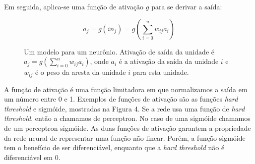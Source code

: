 \documentclass[a4paper,10pt]{article}
\theoremstyle{plain}
\begin{document}
Em seguida, aplica-se uma função de ativação $g$ para se derivar a saída:

\begin{equation*}
  a_j = g(in_j) = g \left(\sum_{i=0}^n w_{ij} a_i\right)
\end{equation*}

\begin{figure}[h]
  \caption{Um modelo para um neurônio. Ativação de saída da unidade é $a_j = g(\sum_{i=0}^n w_{ij}
    a_i)$, onde $a_i$ é a ativação da saída da unidade $i$ e $w_{ij}$ é o peso da aresta da unidade
    $i$ para esta unidade.}
\end{figure}

A função de ativação é uma função limitadora em que normalizamos a saída em um número entre 0 e 1.
Exemplos de funções de ativação são as funções \textit{hard threshold} e sigmóide, mostradas na
Figura 4. Se a rede usa uma função de \textit{hard threshold}, então a chamamos de perceptron. No
caso de uma sigmóide chamamos de um perceptron sigmóide. As duas funções de ativação garantem a
propriedade da rede neural de representar uma função não-linear. Porém, a função sigmóide tem o
benefício de ser diferenciável, enquanto que a \textit{hard threshold} não é diferenciável em 0.
\end{document}

